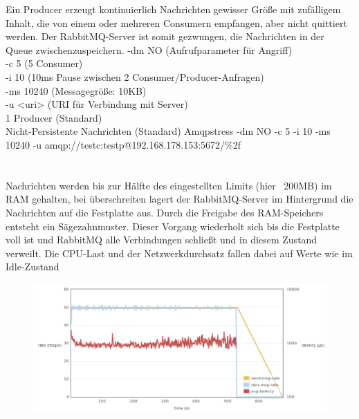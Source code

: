 \documentclass[	a4paper,
			11pt,
			titlepage,
			oneside,
			fleqn,
			listof=totoc,
			parskip,
			numbers=noenddot]{scrartcl}
\begin{document}
\clearpage
		{Ein Producer erzeugt kontinuierlich Nachrichten gewisser Größe mit zufälligem Inhalt, die von einem oder mehreren Consumern empfangen, aber nicht quittiert werden.%
		 Der RabbitMQ-Server ist somit gezwungen, die Nachrichten in der Queue zwischenzuspeichern.}%
		{%
		 -dm NO (Aufrufparameter für Angriff) \\
		 -c 5 (5 Consumer) \\
		 -i 10 (10ms Pause zwischen 2 Consumer/Producer-Anfragen) \\
		 -ms 10240 (Messagegröße: 10KB) \\
		 -u <uri> (URI für Verbindung mit Server) \\
		 1 Producer (Standard) \\
		 Nicht-Persistente Nachrichten (Standard)
		}%
		{Amqpstress -dm NO -c 5 -i 10 -ms 10240 -u amqp://testc:testp@192.168.178.153:5672/\%2f}%
		{%
		 \\
		 \\
		 \\
		}%
		{Nachrichten werden bis zur Hälfte des eingestellten Limits (hier ~200MB) im RAM gehalten, bei überschreiten lagert der RabbitMQ-Server im Hintergrund die Nachrichten auf die Festplatte aus. Durch die Freigabe des RAM-Speichers entsteht ein Sägezahnmuster. Dieser Vorgang wiederholt sich bis die Festplatte voll ist und RabbitMQ alle Verbindungen schließt und in diesem Zustand verweilt. Die CPU-Last und der Netzwerkdurchsatz fallen dabei auf Werte wie im Idle-Zustand}%
		
		\begin{figure}[!htb]
			\centering
			\includegraphics[width=\textwidth]{img/no.png}
		\end{figure}
		
\end{document}
